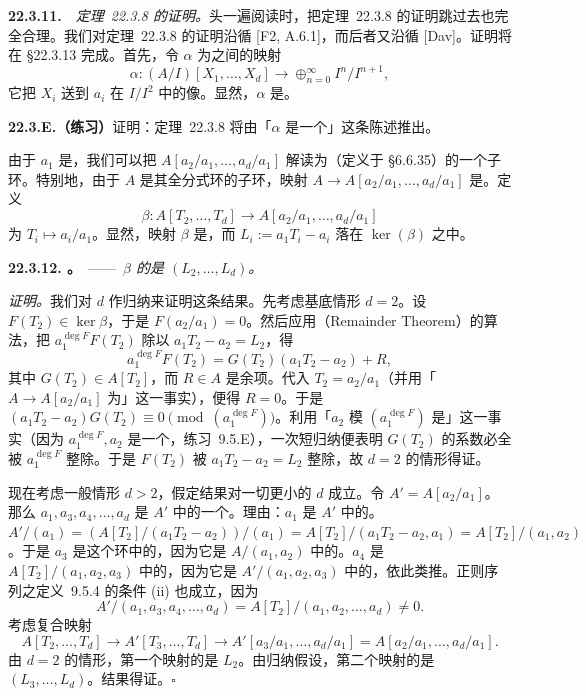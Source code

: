 \textbf{22.3.11.}\ \hard\ \emph{\mbox{定理~22.3.8} 的证明。}\quad 头一遍阅读时，把\mbox{定理~22.3.8} 的证明跳过去也完全合理。我们对\mbox{定理~22.3.8} 的证明沿循 [F2, A.6.1]，而后者又沿循 [Dav]。证明将在 \S22.3.13 完成。首先，令 $\alpha$ 为\trGradedRing{}之间的映射
\[
\alpha\colon (A/I)[X_1,\dots,X_d]\longrightarrow\oplus_{n=0}^{\infty}I^n/I^{n+1},
\]
它把 $X_i$ 送到 $a_i$ 在 $I/I^2$ 中的像。显然，$\alpha$ 是\trSurjectiveMap。

\textbf{22.3.E.（练习）}\quad 证明：\mbox{定理~22.3.8} 将由「$\alpha$ 是一个\trIsomorphism」这条陈述推出。

由于 $a_1$ 是\trNonZerodivisor，我们可以把 $A[a_2/a_1,\dots,a_d/a_1]$ 解读为\trTotalFractionRing（定义于 \S6.6.35）的一个子环。特别地，由于 $A$ 是其全分式环的子环，映射 $A\to A[a_2/a_1,\dots,a_d/a_1]$ 是\trInjectiveMap。定义
\[
\beta\colon A[T_2,\dots,T_d]\longrightarrow A[a_2/a_1,\dots,a_d/a_1]
\]
为 $T_i\mapsto a_i/a_1$。显然，映射 $\beta$ 是\trSurjectiveMap，而 $L_i:=a_1T_i-a_i$ 落在 $\ker(\beta)$ 之中。

\textbf{22.3.12. \trhLemma。}\ ——\ \emph{$\beta$ 的\trKernel{}是 $(L_2,\dots,L_d)$。}

\emph{证明。}\quad 我们对 $d$ 作归纳来证明这条结果。先考虑基底情形 $d=2$。设 $F(T_2)\in\ker\beta$，于是 $F(a_2/a_1)=0$。然后应用\trRemainderTheorem（Remainder Theorem）的算法，把 $a_1^{\deg F}F(T_2)$ 除以 $a_1T_2-a_2=L_2$，得
\[
\tag{22.3.12.1}\label{eq:division-remainder}
a_1^{\deg F}F(T_2)=G(T_2)(a_1T_2-a_2)+R,
\]
其中 $G(T_2)\in A[T_2]$，而 $R\in A$ 是余项。代入 $T_2=a_2/a_1$（并用「$A\to A[a_2/a_1]$ 为\trInjectiveMap」这一事实），便得 $R=0$。于是 $(a_1T_2-a_2)G(T_2)\equiv 0\pmod{(a_1^{\deg F})}$。利用「$a_2$ 模 $(a_1^{\deg F})$ 是\trNonZerodivisor」这一事实（因为 $a_1^{\deg F},a_2$ 是一个\trRegularSequence，\mbox{练习~9.5.E}），一次短归纳便表明 $G(T_2)$ 的系数必全被 $a_1^{\deg F}$ 整除。于是 $F(T_2)$ 被 $a_1T_2-a_2=L_2$ 整除，故 $d=2$ 的情形得证。

现在考虑一般情形 $d>2$，假定结果对一切更小的 $d$ 成立。令 $A'=A[a_2/a_1]$。那么 $a_1,a_3,a_4,\dots,a_d$ 是 $A'$ 中的一个\trRegularSequence。理由：$a_1$ 是 $A'$ 中的\trNonZerodivisor。$A'/(a_1)=(A[T_2]/(a_1T_2-a_2))/(a_1)=A[T_2]/(a_1T_2-a_2,a_1)=A[T_2]/(a_1,a_2)$。于是 $a_3$ 是这个环中的\trNonZerodivisor，因为它是 $A/(a_1,a_2)$ 中的\trNonZerodivisor。$a_4$ 是 $A[T_2]/(a_1,a_2,a_3)$ 中的\trNonZerodivisor，因为它是 $A'/(a_1,a_2,a_3)$ 中的\trNonZerodivisor，依此类推。正则序列之\mbox{定义~9.5.4} 的条件 (ii) 也成立，因为
\[
A'/(a_1,a_3,a_4,\dots,a_d)=A[T_2]/(a_1,a_2,\dots,a_d)\neq 0.
\]
考虑复合映射
\[
A[T_2,\dots,T_d]\to A'[T_3,\dots,T_d]\longrightarrow A'[a_3/a_1,\dots,a_d/a_1]=A[a_2/a_1,\dots,a_d/a_1].
\]
由 $d=2$ 的情形，第一个映射的\trKernel{}是 $L_2$。由归纳假设，第二个映射的\trKernel{}是 $(L_3,\dots,L_d)$。结果得证。\hfill$\square$

